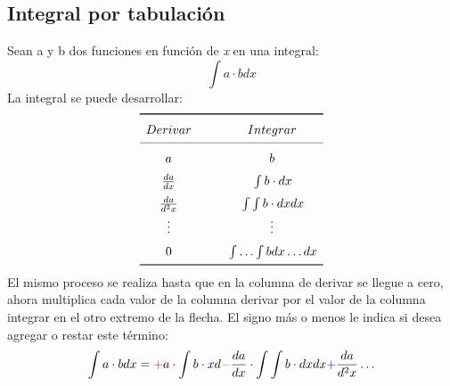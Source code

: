 \documentclass[
	11pt, %
	fleqn, %
	a4paper, %
]{LegrandOrangeBook}
\begin{document}
\subsection{Integral por tabulación}
Sean a y b dos funciones en función de \textit{x} en una integral:
\begin{displaymath}
\int a\cdot b dx
\end{displaymath}
La integral se puede desarrollar:
\[
    \renewcommand{\arraystretch}{1.5}
    \begin{array}{c @{\hspace*{1.0cm}} c}\toprule
       Derivar & Integrar \\\cmidrule{1-2}
      a\tikzmark{Left 1} & \tikzmark{Right 1}b \\
      \frac{da}{dx} \tikzmark{Left 2} & \tikzmark{Right 2}\int b\cdot dx \\      
      \frac{da}{d^2x}  \tikzmark{Left 3} & \tikzmark{Right 3}\int\int b\cdot dx dx \\      
      \vdots  \tikzmark{Left 4} & \tikzmark{Right 4}\vdots \\
      0  \tikzmark{Left 5} & \tikzmark{Right 5}\int\ldots\int b dx\ldots dx \\
      \bottomrule
    \end{array}
\]
%
%
%
%
El mismo proceso se realiza hasta que en la columna de derivar se llegue a cero, ahora multiplica cada valor de la columna derivar por el valor de la columna integrar en el otro extremo de la flecha. El signo más o menos le indica si desea agregar o restar este término:
\begin{equation}
\label{art:integral pr tabulacion}
\int a\cdot b dx=\textcolor{red}+a\cdot\int b\cdot xd \textcolor{brown}{-}\frac{da}{dx}\cdot\int\int b\cdot dx dx\textcolor{blue}{+}\frac{da}{d^2x}\ldots
\end{equation}
\end{document}
